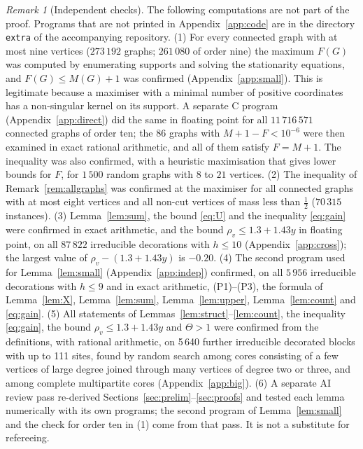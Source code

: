 \documentclass[11pt,a4paper]{article}
\theoremstyle{definition}
\theoremstyle{remark}
\newtheorem{remark}[theorem]{Remark}
\numberwithin{equation}{section}
\begin{document}
\begin{remark}[Independent checks]\label{rem:checks}
The following computations are not part of the proof. Programs that are not printed
in Appendix~\ref{app:code} are in the directory \texttt{extra} of the accompanying
repository.
(1) For every connected graph with at most nine vertices ($273\,192$ graphs;
$261\,080$ of order nine) the maximum $F(G)$ was computed by enumerating supports
and solving the stationarity equations, and $F(G)\le M(G)+1$ was confirmed
(Appendix~\ref{app:small}). This is legitimate because a maximiser with a minimal
number of positive coordinates has a non-singular kernel on its support. A separate C program (Appendix~\ref{app:direct}) did the same in floating point for all $11\,716\,571$ connected graphs of order ten; the $86$ graphs with $M+1-F<10^{-6}$ were then examined in exact rational arithmetic, and all of them satisfy $F=M+1$.
The inequality was also confirmed, with a heuristic maximisation that gives lower
bounds for $F$, for $1\,500$ random graphs with $8$ to $21$ vertices.
(2) The inequality of Remark~\ref{rem:allgraphs} was confirmed at the maximiser for
all connected graphs with at most eight vertices and all non-cut vertices of mass
less than $\frac12$ ($70\,315$ instances).
(3) Lemma~\ref{lem:sum}, the bound \eqref{eq:U} and the inequality \eqref{eq:gain}
were confirmed in exact arithmetic, and the bound $\rho_v\le1.3+1.43y$ in floating
point, on all $87\,822$ irreducible decorations with $h\le10$
(Appendix~\ref{app:cross}); the largest value of $\rho_v-(1.3+1.43y)$ is $-0.20$.
(4) The second program used for Lemma~\ref{lem:small} (Appendix~\ref{app:indep})
confirmed, on all $5\,956$ irreducible decorations with $h\le9$ and in exact
arithmetic, (P1)--(P3), the formula of Lemma~\ref{lem:X}, Lemma~\ref{lem:sum},
Lemma~\ref{lem:upper}, Lemma~\ref{lem:count} and \eqref{eq:gain}.
(5) All statements of Lemmas~\ref{lem:struct}--\ref{lem:count}, the inequality
\eqref{eq:gain}, the bound $\rho_v\le1.3+1.43y$ and $\Theta>1$ were confirmed from
the definitions, with rational arithmetic, on 5\,640 further irreducible decorated
blocks with up to 111 sites, found by random search among cores consisting of a
few vertices of large degree joined through many vertices of degree two or three,
and among complete multipartite cores (Appendix~\ref{app:big}).
(6) A separate AI review pass re-derived Sections~\ref{sec:prelim}--\ref{sec:proofs}
and tested each lemma numerically with its own programs; the second program of Lemma~\ref{lem:small} and the check for order ten in (1) come from that pass. It is
not a substitute for refereeing.
\end{remark}
\end{document}

